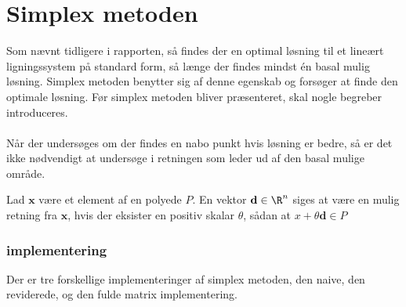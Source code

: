 \chapter{Simplex metoden}
\label{coronaaaaaaaaaaa}
Som nævnt tidligere i rapporten, så findes der en optimal løsning til et lineært ligningssystem på standard form, så længe der findes mindst én basal mulig løsning. 
Simplex metoden benytter sig af denne egenskab og forsøger at finde den optimale løsning. Før simplex metoden bliver præsenteret, skal nogle begreber introduceres.
%
\\\\
%
Når der undersøges om der findes en nabo punkt hvis løsning er bedre, så er det ikke nødvendigt at undersøge i retningen som leder ud af den basal mulige område.

\begin{defn}{}{}
Lad $\textbf{x}$ være et element af en polyede $P$.
En vektor $\textbf{d}\in \R^n$ siges at være en mulig retning fra $\textbf{x}$, hvis der eksister en positiv skalar $\theta$, sådan at $x+\theta \textbf{d}\in P$
\end{defn}
%


\subsection{implementering}
Der er tre forskellige implementeringer af simplex metoden, den naive, den reviderede, og den fulde matrix implementering. 
